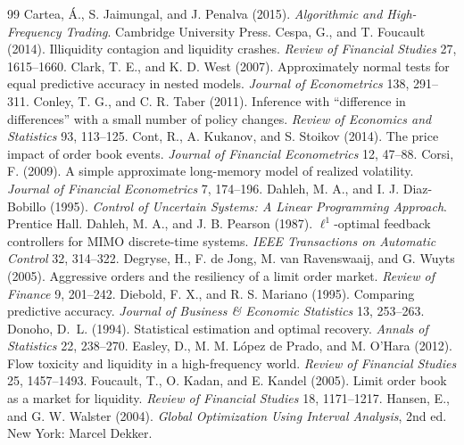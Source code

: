\begin{thebibliography}{99}
 Cartea, \'A., S. Jaimungal, and J. Penalva (2015). \emph{Algorithmic and High-Frequency Trading}. Cambridge University Press.
 Cespa, G., and T. Foucault (2014). Illiquidity contagion and liquidity crashes. \emph{Review of Financial Studies} 27, 1615--1660.
 Clark, T. E., and K. D. West (2007). Approximately normal tests for equal predictive accuracy in nested models. \emph{Journal of Econometrics} 138, 291--311.
 Conley, T. G., and C. R. Taber (2011). Inference with ``difference in differences'' with a small number of policy changes. \emph{Review of Economics and Statistics} 93, 113--125.
 Cont, R., A. Kukanov, and S. Stoikov (2014). The price impact of order book events. \emph{Journal of Financial Econometrics} 12, 47--88.
 Corsi, F. (2009). A simple approximate long-memory model of realized volatility. \emph{Journal of Financial Econometrics} 7, 174--196.
 Dahleh, M. A., and I. J. Diaz-Bobillo (1995). \emph{Control of Uncertain Systems: A Linear Programming Approach}. Prentice Hall.
 Dahleh, M. A., and J. B. Pearson (1987). $\ell^1$-optimal feedback controllers for MIMO discrete-time systems. \emph{IEEE Transactions on Automatic Control} 32, 314--322.
 Degryse, H., F. de Jong, M. van Ravenswaaij, and G. Wuyts (2005). Aggressive orders and the resiliency of a limit order market. \emph{Review of Finance} 9, 201--242.
 Diebold, F. X., and R. S. Mariano (1995). Comparing predictive accuracy. \emph{Journal of Business \& Economic Statistics} 13, 253--263.
 Donoho, D.~L. (1994). Statistical estimation and optimal recovery. \emph{Annals of Statistics} 22, 238--270.
 Easley, D., M. M. L\'opez de Prado, and M. O'Hara (2012). Flow toxicity and liquidity in a high-frequency world. \emph{Review of Financial Studies} 25, 1457--1493.
 Foucault, T., O. Kadan, and E. Kandel (2005). Limit order book as a market for liquidity. \emph{Review of Financial Studies} 18, 1171--1217.
 Hansen, E., and G. W. Walster (2004). \emph{Global Optimization Using Interval Analysis}, 2nd ed. New York: Marcel Dekker.

\end{thebibliography}
